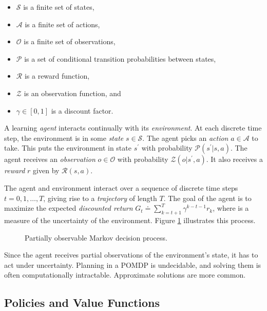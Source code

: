 \begin{itemize}
    \item \(\mathcal{S}\) is a finite set of states,
    \item \(\mathcal{A}\) is a finite set of actions,
    \item \(\mathcal{O}\) is a finite set of observations,
    \item \(\mathcal{P}\) is a set of conditional transition probabilities between states,
    \item \(\mathcal{R}\) is a reward function,
    \item \(\mathcal{Z}\) is an observation function, and
    \item \(\gamma \in [0, 1]\) is a discount factor.
\end{itemize}

A learning \textit{agent} interacts continually with its \textit{environment}.
At each discrete time step, the environment is in some \textit{state} \(s \in \mathcal{S}\).
The agent picks an \textit{action} \(a \in \mathcal{A}\) to take.
This puts the environment in state \(s^\prime\) with probability \(\mathcal{P}(s^\prime | s, a)\).
The agent receives an \textit{observation} \(o \in \mathcal{O}\) with probability \(\mathcal{Z}(o | s^\prime, a)\).
It also receives a \textit{reward} \(r\) given by \(\mathcal{R}(s, a)\).

The agent and environment interact over a sequence of discrete time steps \(t = 0, 1, \dots, T\), giving rise to a \textit{trajectory} of length \(T\).
The goal of the agent is to maximize the expected \textit{discounted return} \(G_t \doteq \sum_{k=t+1}^{T}\gamma^{k-t-1}r_k\), where \gamma is a measure of the uncertainty of the environment.  
Figure \ref{fig:pomdp} illustrates this process.

\begin{figure}
    \centering
    
    \label{fig:pomdp}
    \caption{Partially observable Markov decision process.}
\end{figure}

Since the agent receives partial observations of the environment's state, it has to act under uncertainty.
Planning in a POMDP is undecidable, and solving them is often computationally intractable.
Approximate solutions are more common.

\subsection{Policies and Value Functions}

